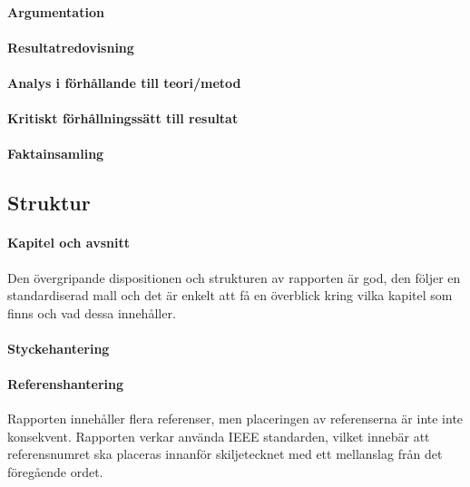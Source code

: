     \paragraph{Argumentation}

    \paragraph{Resultatredovisning}

    \paragraph{Analys i förhållande till teori/metod  }

    \paragraph{Kritiskt förhållningssätt till resultat}

    \paragraph{Faktainsamling}


    \subsection{Struktur} %
    \label{sub:sturktur}
    \paragraph{Kapitel och avsnitt}
        Den övergripande dispositionen och strukturen av rapporten är god, den följer en standardiserad mall och det är enkelt att få en överblick kring vilka kapitel som finns och vad dessa innehåller. \bigskip
     
    \paragraph{Styckehantering}

    \paragraph{Referenshantering}
         Rapporten innehåller flera referenser, men placeringen av referenserna är inte inte konsekvent. Rapporten verkar använda IEEE standarden, vilket innebär att referensnumret ska placeras innanför skiljetecknet med ett mellanslag från det föregående ordet.
